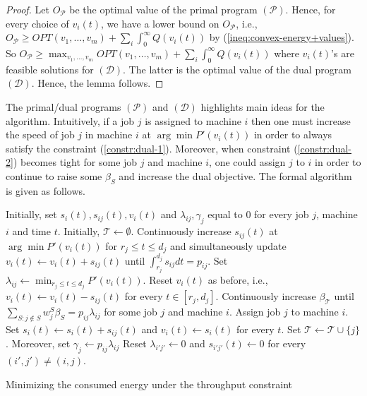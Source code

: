 \documentclass[11pt,a4paper]{article}
\begin{document}
\begin{proof}
Let $O_{\mathcal{P}}$ be the optimal value of the primal program $(\mathcal{P})$.
Hence, for every choice of $v_{i}(t)$, we have a lower bound on $O_{\mathcal{P}}$, i.e., 
$O_{\mathcal{P}} \geq OPT(v_{1}, \ldots, v_{m}) + \sum_{i} \int_{0}^{\infty} Q(v_{i}(t))$ 
by (\ref{ineq:convex-energy+values}). 
So $O_{\mathcal{P}} \geq \max_{v_{1}, \ldots, v_{m}} OPT(v_{1}, \ldots, v_{m}) + \sum_{i}\int_{0}^{\infty} Q(v_{i}(t))$
where $v_{i}(t)$'s are feasible solutions for $(\mathcal{D})$. 
The latter is the optimal value of the dual program $(\mathcal{D})$. Hence, 
the lemma follows.  
\end{proof}

The primal/dual programs $(\mathcal{P})$ and $(\mathcal{D})$ 
highlights main ideas for the algorithm. 
Intuitively, if a job $j$ is assigned to machine $i$ then
one must increase the speed of job $j$ in machine $i$ at 
$\arg \min P'(v_{i}(t))$ in order to always 
satisfy the constraint (\ref{constr:dual-1}). 
Moreover, when constraint (\ref{constr:dual-2}) becomes tight for some job $j$
and machine $i$, one could assign $j$ to $i$ in order to continue to raise some $\beta_{S}$
and increase the dual objective. The formal algorithm is given as follows.


\begin{algorithm}[H]
\begin{algorithmic}[1] 
\STATE Initially, set $s_{i}(t), s_{ij}(t), v_{i}(t)$ and $\lambda_{ij}, \gamma_{j}$ equal to 0
	for every job $j$, machine $i$ and time $t$.
\STATE Initially, $\mathcal{T} \gets \emptyset$.
		\STATE Continuously increase $s_{ij}(t)$ at $\arg \min P'(v_{i}(t))$  for $r_{j} \leq t \leq d_{j}$
			and simultaneously update $v_{i}(t) \gets v_{i}(t) + s_{ij}(t)$
			until $\int_{r_{j}}^{d_{j}}s_{ij}dt = p_{ij}$.
		\STATE Set $\lambda_{ij} \gets \min_{r_{j} \leq t \leq d_{j}} P'(v_{i}(t))$.
		\STATE Reset $v_{i}(t)$ as before, i.e., $v_{i}(t) \gets v_{i}(t) - s_{ij}(t)$ for every $t \in [r_{j},d_{j}]$.
	\ENDFOR 
	\STATE Continuously increase $\beta_{\mathcal{T}}$ until
		$\sum_{S: j \notin S} w^{S}_{j}\beta_{S} = p_{ij}\lambda_{ij}$ for some job $j$ 
		and machine $i$.
	\STATE Assign job $j$ to machine $i$. Set $s_{i}(t) \gets s_{i}(t) + s_{ij}(t)$ and $v_{i}(t) \gets s_{i}(t)$
		for every $t$.
	\STATE Set $\mathcal{T} \gets \mathcal{T} \cup \{j\}$. Moreover, set $\gamma_{j} \gets p_{ij}\lambda_{ij}$
	\STATE Reset $\lambda_{i'j'} \gets 0$ and $s_{i'j'}(t) \gets 0$ for every $(i',j') \neq (i,j)$.
\ENDWHILE
\end{algorithmic}
\caption{Minimizing the consumed energy under the throughput constraint}
\label{algo:energy}
\end{algorithm}
\end{document}
